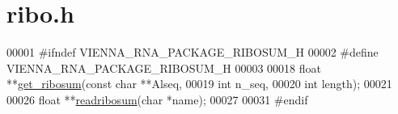 \hypertarget{ribo_8h_source}{\section{ribo.\+h}
\label{ribo_8h_source}
}

\begin{DoxyCode}
00001 \textcolor{preprocessor}{#ifndef VIENNA\_RNA\_PACKAGE\_RIBOSUM\_H}
00002 \textcolor{preprocessor}{#define VIENNA\_RNA\_PACKAGE\_RIBOSUM\_H}
00003 
00018 \textcolor{keywordtype}{float} **\hyperlink{group__consensus__fold_ga1116aed4b2dab5252cd23946d47d52c3}{get\_ribosum}(\textcolor{keyword}{const} \textcolor{keywordtype}{char} **Alseq,
00019                     \textcolor{keywordtype}{int} n\_seq,
00020                     \textcolor{keywordtype}{int} length);
00021 
00026 \textcolor{keywordtype}{float}   **\hyperlink{group__file__utils_ga5e125c9586fcd4e2e1559fe76f7289cc}{readribosum}(\textcolor{keywordtype}{char} *name);
00027 
00031 \textcolor{preprocessor}{#endif}
\end{DoxyCode}
